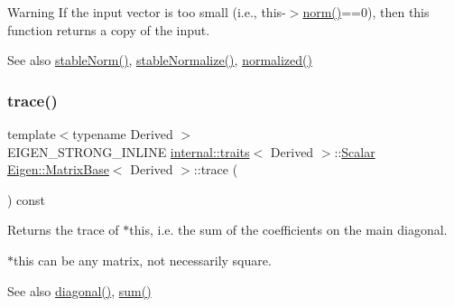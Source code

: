 \begin{DoxyWarning}{Warning}
If the input vector is too small (i.\+e., this-\/$>$\mbox{\hyperlink{class_eigen_1_1_matrix_base_a5f6a3bc46add1f2e879ce15040e6987e}{norm()}}==0), then this function returns a copy of the input.
\end{DoxyWarning}
\begin{DoxySeeAlso}{See also}
\mbox{\hyperlink{class_eigen_1_1_matrix_base_ab84d3e64f855813b1eea4202c0697dc1}{stable\+Norm()}}, \mbox{\hyperlink{class_eigen_1_1_matrix_base_aaf1f5a729324eecc1399591ce9324e9a}{stable\+Normalize()}}, \mbox{\hyperlink{class_eigen_1_1_matrix_base_a6ede5c8ebe9631fed9004fedbf9e4016}{normalized()}} 
\end{DoxySeeAlso}
\mbox{\label{class_eigen_1_1_matrix_base_a2cc7a95b161f3a660bdb8ff048b44161}} 
\subsubsection{\texorpdfstring{trace()}{trace()}}
{\footnotesize\ttfamily template$<$typename Derived $>$ \\
E\+I\+G\+E\+N\+\_\+\+S\+T\+R\+O\+N\+G\+\_\+\+I\+N\+L\+I\+NE \mbox{\hyperlink{struct_eigen_1_1internal_1_1traits}{internal\+::traits}}$<$ Derived $>$\+::\mbox{\hyperlink{class_eigen_1_1_dense_base_a5feed465b3a8e60c47e73ecce83e39a2}{Scalar}} \mbox{\hyperlink{class_eigen_1_1_matrix_base}{Eigen\+::\+Matrix\+Base}}$<$ Derived $>$\+::trace (\begin{DoxyParamCaption}{ }\end{DoxyParamCaption}) const}

\begin{DoxyReturn}{Returns}
the trace of {\ttfamily $\ast$this}, i.\+e. the sum of the coefficients on the main diagonal.
\end{DoxyReturn}
{\ttfamily $\ast$this} can be any matrix, not necessarily square.

\begin{DoxySeeAlso}{See also}
\mbox{\hyperlink{class_eigen_1_1_matrix_base_ab5768147536273eb2dbdfa389cfd26a3}{diagonal()}}, \mbox{\hyperlink{class_eigen_1_1_dense_base_a4dee689c76ff86da9d8e49950604597b}{sum()}} 
\end{DoxySeeAlso}
\mbox{\label{class_eigen_1_1_matrix_base_a56665aa894f49f2765291fee0eaeb9c6}} 
